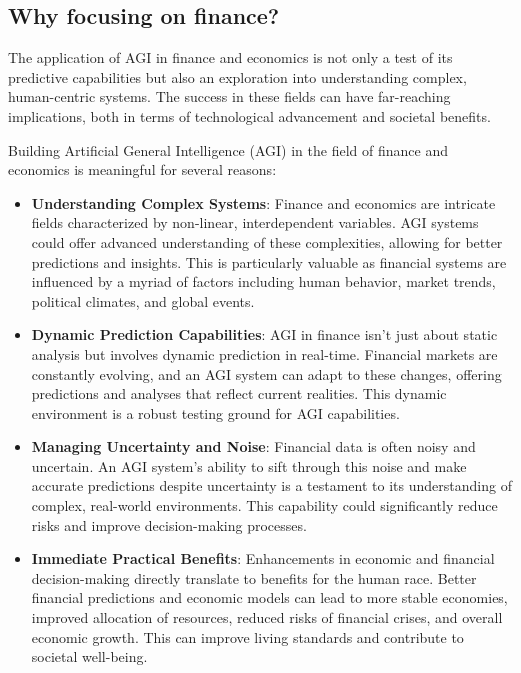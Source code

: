 \documentclass[11pt, reqno]{amsart}
\theoremstyle{definition}
\theoremstyle{remark}
\begin{document}
	\subsection{Why focusing on finance?}

	The application of AGI in finance and economics is not only a test of its
	predictive capabilities but also an exploration into understanding complex,
	human-centric systems. The success in these fields can have far-reaching implications,
	both in terms of technological advancement and societal benefits.

	Building Artificial General Intelligence (AGI) in the field of finance
	and economics is meaningful for several reasons:

	\begin{itemize}
		\item \textbf{Understanding Complex Systems}: Finance and economics are
			intricate fields characterized by non-linear, interdependent
			variables. AGI systems could offer advanced understanding of these complexities,
			allowing for better predictions and insights. This is particularly valuable
			as financial systems are influenced by a myriad of factors including human
			behavior, market trends, political climates, and global events.

		\item \textbf{Dynamic Prediction Capabilities}: AGI in finance isn't just
			about static analysis but involves dynamic prediction in real-time.
			Financial markets are constantly evolving, and an AGI system can adapt
			to these changes, offering predictions and analyses that reflect
			current realities. This dynamic environment is a robust testing ground
			for AGI capabilities.

		\item \textbf{Managing Uncertainty and Noise}: Financial data is often noisy
			and uncertain. An AGI system's ability to sift through this noise and
			make accurate predictions despite uncertainty is a testament to its
			understanding of complex, real-world environments. This capability
			could significantly reduce risks and improve decision-making
			processes.

		\item \textbf{Immediate Practical Benefits}: Enhancements in economic and
			financial decision-making directly translate to benefits for the human
			race. Better financial predictions and economic models can lead to
			more stable economies, improved allocation of resources, reduced
			risks of financial crises, and overall economic growth. This can
			improve living standards and contribute to societal well-being.


\end{itemize}
\end{document}
